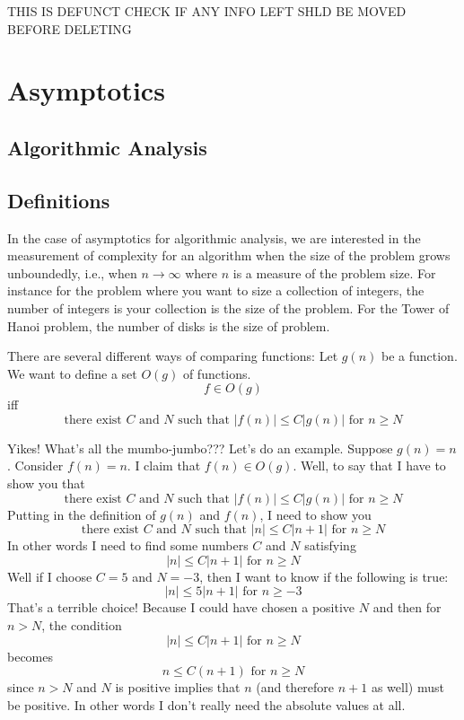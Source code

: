THIS IS DEFUNCT
CHECK IF ANY INFO LEFT SHLD BE MOVED BEFORE DELETING

\chapter{Asymptotics}

\section{Algorithmic Analysis}





\section{Definitions}

In the case of asymptotics for algorithmic analysis, we are
interested in the measurement of complexity for an algorithm when
the size of the problem grows unboundedly, i.e., when $n
\rightarrow \infty$ where $n$ is a measure of the problem size.
For instance for the problem where you want to size a collection
of integers, the number of integers is your collection is the size
of the problem. For the Tower of Hanoi problem, the number of
disks is the size of problem.


There are several different ways of comparing functions: Let
$g(n)$ be a function. We want to define a set $O(g)$ of functions. 
\[ f \in O(g) \]
iff 
\[
\text{there exist $C$ and $N$ such that $|f(n)| \leq C|g(n)|$ 
for $n \geq N$}
\]

Yikes! What's all the mumbo-jumbo??? Let's do an example. 
Suppose $g(n) = n$. Consider $f(n) = n$. I claim that $f(n) \in O(g)$. 
Well, to say that I have to show you that
\[
\text{there exist $C$ and $N$ such that $|f(n)| \leq C|g(n)|$ 
for $n \geq N$}
\]
Putting in the definition of $g(n)$ and $f(n)$, I need to show you
\[
\text{there exist $C$ and $N$ such that $|n| \leq C|n+1|$ 
for $n \geq N$}
\]
In other words I need to find some numbers $C$ and $N$ satisfying
\[
\text{$|n| \leq C|n+1|$ for $n \geq N$}
\]
Well if I choose $C = 5$ and $N = -3$, then I want to know if 
the following is true:
\[
\text{$|n| \leq 5|n+1|$ for $n \geq -3$}
\]
That's a terrible choice! Because I could have chosen a positive $N$ and then for $n > N$, the condition
\[
\text{$|n| \leq C|n+1|$ for $n \geq N$}
\]
becomes
\[
\text{$n \leq C(n+1)$ for $n \geq N$}
\]
since $n > N$ and $N$ is positive implies that $n$ (and therefore $n+1$ as 
well) must be positive. In other words I don't really need the absolute values at all.

